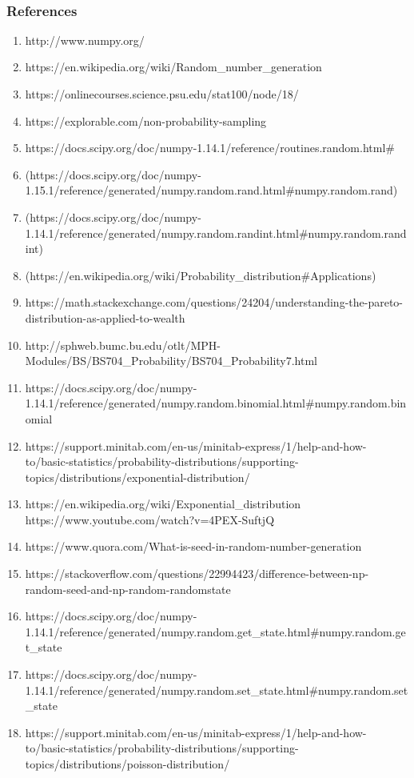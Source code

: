 \documentclass[11pt]{article}
\providecommand{\tightlist}{%
      \setlength{\itemsep}{0pt}\setlength{\parskip}{0pt}}
\begin{document}
    \begin{center}
    \end{center}
    { \hspace*{\fill} \\}
    
    \subsubsection{References}\label{references}

    \begin{enumerate}
\def\labelenumi{\arabic{enumi}.}
\tightlist
\item
  http://www.numpy.org/
\item
  https://en.wikipedia.org/wiki/Random\_number\_generation
\item
  https://onlinecourses.science.psu.edu/stat100/node/18/
\item
  https://explorable.com/non-probability-sampling
\item
  https://docs.scipy.org/doc/numpy-1.14.1/reference/routines.random.html\#
\item
  (https://docs.scipy.org/doc/numpy-1.15.1/reference/generated/numpy.random.rand.html\#numpy.random.rand)
\item
  (https://docs.scipy.org/doc/numpy-1.14.1/reference/generated/numpy.random.randint.html\#numpy.random.randint)
\item
  (https://en.wikipedia.org/wiki/Probability\_distribution\#Applications)
\item
  https://math.stackexchange.com/questions/24204/understanding-the-pareto-distribution-as-applied-to-wealth
\item
  http://sphweb.bumc.bu.edu/otlt/MPH-Modules/BS/BS704\_Probability/BS704\_Probability7.html
\item
  https://docs.scipy.org/doc/numpy-1.14.1/reference/generated/numpy.random.binomial.html\#numpy.random.binomial
\item
  https://support.minitab.com/en-us/minitab-express/1/help-and-how-to/basic-statistics/probability-distributions/supporting-topics/distributions/exponential-distribution/
\item
  https://en.wikipedia.org/wiki/Exponential\_distribution
  https://www.youtube.com/watch?v=4PEX-SuftjQ
\item
  https://www.quora.com/What-is-seed-in-random-number-generation
\item
  https://stackoverflow.com/questions/22994423/difference-between-np-random-seed-and-np-random-randomstate
\item
  https://docs.scipy.org/doc/numpy-1.14.1/reference/generated/numpy.random.get\_state.html\#numpy.random.get\_state
\item
  https://docs.scipy.org/doc/numpy-1.14.1/reference/generated/numpy.random.set\_state.html\#numpy.random.set\_state
\item
  https://support.minitab.com/en-us/minitab-express/1/help-and-how-to/basic-statistics/probability-distributions/supporting-topics/distributions/poisson-distribution/
\end{enumerate}


    
    
    
    
\end{document}
